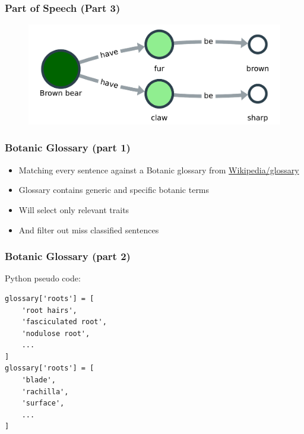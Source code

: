 \documentclass{beamer}
\begin{document}
\begin{frame}
\frametitle{Part of Speech (Part 3)}
\begin{figure} [htbp]
        \centering
        \includegraphics[width=\textwidth]{figures/kn_example_v2.pdf}
        \label{fig:graph_example}    
\end{figure}
\end{frame}



{
{
    \hspace{5.5cm}
    
}
\begin{frame}
\frametitle{Botanic Glossary (part 1)}
\begin{itemize}
    \item Matching every sentence against a Botanic glossary from \href{https://en.wikipedia.org/wiki/Glossary_of_plant_morphology}{Wikipedia/glossary}
    \item Glossary contains generic and specific botanic terms
    \item Will select only relevant traits
    \item And filter out miss classified sentences
\end{itemize}
\end{frame}
}


\begin{frame}[fragile]
\frametitle{Botanic Glossary (part 2)}
Python pseudo code:

\begin{lstlisting}
glossary['roots'] = [
    'root hairs',
    'fasciculated root',
    'nodulose root',
    ...
]
glossary['roots'] = [
    'blade',
    'rachilla',
    'surface',
    ...
]
\end{lstlisting}
\end{frame}
\end{document}
